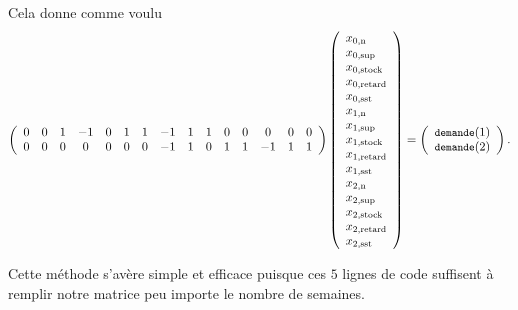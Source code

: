 Cela donne comme voulu
\[
    \left(
    \begin{array}{*{15}c}
      0 & 0 & 1 & -1 & 0 & 1 & 1 & -1 & 1 & 1 & 0 & 0 &  0 & 0 & 0 \\
      0 & 0 & 0 &  0 & 0 & 0 & 0 & -1 & 1 & 0 & 1 & 1 & -1 & 1 & 1 
    \end{array}
    \right)
    \left(
    \begin{array}{*{1}l}
      \myX{0}{n}\\ \myX{0}{sup}\\ \myX{0}{stock}\\ \myX{0}{retard}\\ \myX{0}{sst}\\
      \myX{1}{n}\\ \myX{1}{sup}\\ \myX{1}{stock}\\ \myX{1}{retard}\\ \myX{1}{sst}\\
      \myX{2}{n}\\ \myX{2}{sup}\\ \myX{2}{stock}\\ \myX{2}{retard}\\ \myX{2}{sst}
    \end{array}
    \right)
    = 
    \left(
    \begin{array}{*{1}l}
      \texttts{demande}(1) \\ \texttts{demande}(2)
    \end{array}
    \right)
    \text.
\]

Cette méthode s'avère simple et efficace puisque ces $5$ lignes de code suffisent 
à remplir notre matrice peu importe le nombre de semaines.

